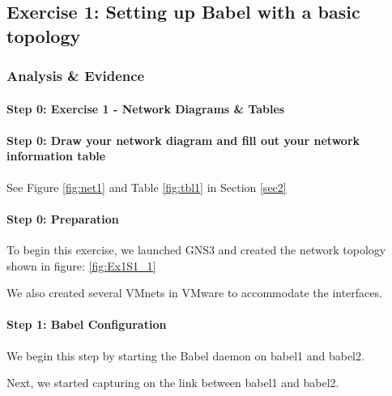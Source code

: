 \documentclass[main.tex]{subfiles}
\begin{document}
\subsection{Exercise 1: Setting up Babel with a basic topology}
\subsubsection{Analysis \& Evidence }
\paragraph{Step 0: Exercise 1 - Network Diagrams \& Tables}
\hfill \break

\paragraph{Step 0: Draw your network diagram and fill out your network information table}
\hfill \break
See Figure \ref{fig:net1} and Table \ref{fig:tbl1} in Section \ref{sec2}

\paragraph{Step 0: Preparation}
\hfill \break
\noindent To begin this exercise, we launched GNS3 and created the network topology shown in figure: \ref{fig:Ex1S1_1}
 

We also created several VMnets in VMware to accommodate the interfaces.



\paragraph{Step 1: Babel Configuration}
\hfill \break
\noindent We begin this step by starting the Babel daemon on babel1 and babel2.


Next, we started capturing on the link between babel1 and babel2.


\end{document}
